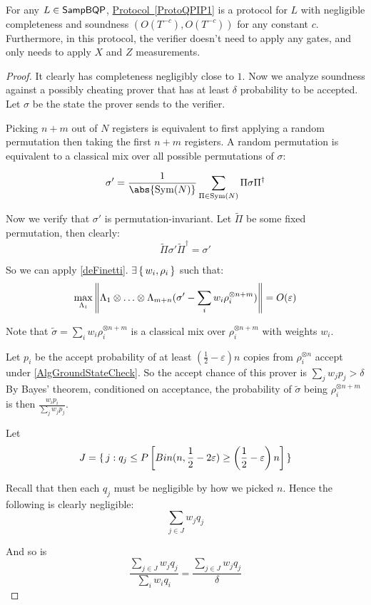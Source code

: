\begin{theorem}
    \label{QPIP1thm}
	For any $L\in\operatorname{\mathsf{SampBQP}}$, \hyperref[ProtoQPIP1]{Protocol~\ref*{ProtoQPIP1}} is a protocol for $L$ with negligible completeness and soundness $(O(T^{-c}), O(T^{-c}))$ for any constant $c$. Furthermore, in this protocol, the verifier doesn't need to apply any gates, and only needs to apply $X$ and $Z$ measurements.
\end{theorem}
\begin{proof}
	It clearly has completeness negligibly close to $1$. Now we analyze soundness against a possibly cheating prover that has at least $\delta$ probability to be accepted. Let $\sigma$ be the state the prover sends to the verifier.

	Picking $n+m$ out of $N$ registers is equivalent to first applying a random permutation then taking the first $n+m$ registers.
	A random permutation is equivalent to a classical mix over all possible permutations of $\sigma$:

	$$\sigma'=\frac{1}{\abs{\Sym(N)}}\sum_{\Pi\in\Sym(N)}\Pi\sigma\Pi^\dagger$$

	Now we verify that $\sigma'$ is permutation-invariant.
	Let $\tilde{\Pi}$ be some fixed permutation, then clearly:
	$$\tilde{\Pi}\sigma'\tilde{\Pi}^\dagger=\sigma'$$

	So we can apply \autoref{deFinetti}. $\exists\set{w_i, \rho_i}$ such that:
	$$\max_{\Lambda_i}\left\lVert\Lambda_1\otimes\ldots\otimes\Lambda_{m+n}(\sigma'-\sum_i w_i\rho_i^{\otimes n+m})\right\rVert=O(\varepsilon)$$

	Note that $\tilde\sigma=\sum_i w_i\rho_i^{\otimes n+m}$ is a classical mix over $\rho_i^{\otimes n+m}$ with weights $w_i$.

	Let $p_i$ be the accept probability of at least $(\frac{1}{2}-\varepsilon)n$ copies from $\rho_i^{\otimes n}$ accept under \autoref{AlgGroundStateCheck}.
	So the accept chance of this prover is $\sum_j w_j p_j>\delta$
	By Bayes' theorem, conditioned on acceptance, the probability of $\tilde{\sigma}$ being $\rho_i^{\otimes n+m}$ is then $\frac{w_i p_i}{\sum_j w_j p_j}$.

	Let
	$$J=\set{j:q_j\leq P\left[Bin(n, \frac{1}{2}-2\varepsilon)\geq\left(\frac{1}{2}-\varepsilon\right)n\right]}$$

	Recall that then each $q_j$ must be negligible by how we picked $n$. Hence the following is clearly negligible:
	$$\sum_{j\in J} w_j q_j$$

	And so is
	$$\frac{\sum_{j\in J} w_j q_j}{\sum_i w_i q_i}=\frac{\sum_{j\in J} w_j q_j}{\delta}$$


\end{proof}
